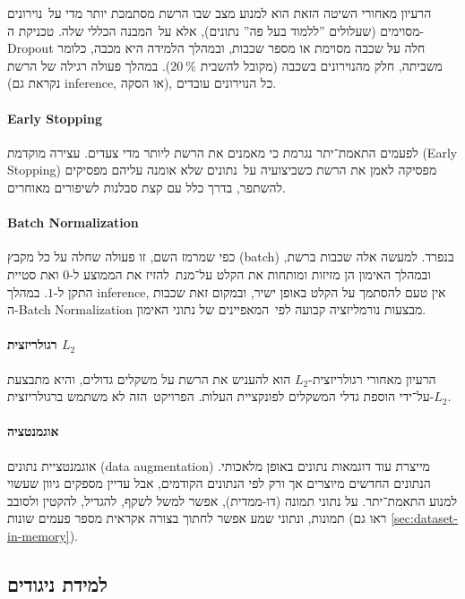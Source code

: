 \documentclass[hebrew, a4paper]{article}
\theoremstyle{plain}
\theoremstyle{definition}
\numberwithin{equation}{section}
\begin{document}
הרעיון מאחורי השיטה הזאת הוא למנוע מצב שבו הרשת מסתמכת יותר מדי
על~נוירונים מסוימים (שעלולים ”ללמוד בעל פה” נתונים), אלא על~המבנה
הכללי שלה. טכניקת ה-Dropout חלה על שכבה מסוימת או מספר שכבות, ובמהלך
הלמידה היא מכבה, כלומר משביתה, חלק מהנוירונים בשכבה (מקובל להשבית
$\SI{20}{\percent}$). במהלך פעולה רגילה של הרשת (נקראת גם inference,
או הסקה), כל הנוירונים עובדים.

\paragraph{Early Stopping}

לפעמים התאמת־יתר נגרמת כי מאמנים את הרשת ליותר מדי צעדים. עצירה מוקדמת
(Early Stopping) מפסיקה לאמן את הרשת כשביצועיה על~נתונים שלא אומנה
עליהם מפסיקים להשתפר, בדרך כלל עם קצת סבלנות לשיפורים מאוחרים.

\paragraph{Batch Normalization}

כפי שמרמז השם, זו פעולה שחלה על כל מקבץ (batch) בנפרד. למעשה אלה שכבות
ברשת, ובמהלך האימון הן מזיזות ומותחות את הקלט על־מנת~להזיז את הממוצע
ל-$0$ ואת סטיית התקן ל-$1$. במהלך inference, אין טעם להסתמך על הקלט
באופן ישיר, ובמקום זאת שכבות ה-Batch Normalization מבצעות נורמליזציה
קבועה לפי~המאפיינים של נתוני האימון.

\paragraph{רגולריזצית $L_2$}

הרעיון מאחורי רגולריזצית-$L_2$ הוא להעניש את הרשת על משקלים גדולים,
והיא מתבצעת על־ידי הוספת גדלי המשקלים לפונקציית העלות. הפרויקט~הזה לא
משתמש ברגולריזצית-$L_2$.

\paragraph{אוגמנטציה}

אוגמנטציית נתונים (data augmentation) מייצרת עוד דוגמאות נתונים באופן
מלאכותי. הנתונים החדשים מיוצרים אך ורק לפי הנתונים הקודמים, אבל עדיין
מספקים גיוון שעשוי למנוע התאמת־יתר. על נתוני תמונה (דו-ממדית), אפשר
למשל לשקף, להגדיל, להקטין ולסובב תמונות, ונתוני שמע אפשר לחתוך בצורה
אקראית מספר פעמים שונות (ראו גם \autoref{sec:dataset-in-memory}).

\subsection{למידת ניגודים}
\label{sec:contrastive-learning}
\end{document}
